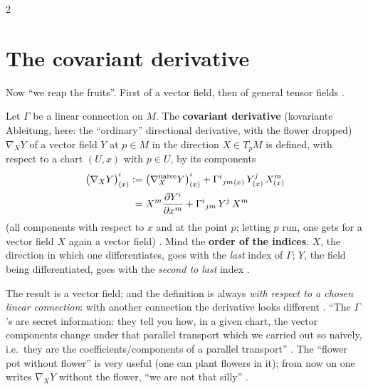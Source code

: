 \begin{paracol}{2}
\section{The covariant derivative}\label{sec:cf-covariant}

Now ``we reap the fruits''. First of a vector field, then of general tensor fields .

\begin{definition}\label{def:cf-covariant}
Let $\Gamma$ be a linear connection on $M$. The \textbf{covariant derivative} (kovariante Ableitung, here: the ``ordinary'' directional
derivative, with the flower dropped) $\nabla_XY$ of a vector field $Y$ at $p\in M$ in the direction $X\in T_pM$ is defined,
with respect to a chart $(U,x)$ with $p\in U$, by its components
\begin{align}\label{eq:cf-covariant}
  \bigl(\nabla_XY\bigr)^i_{(x)}&:=\bigl(\nabla^{\text{naive}}_XY\bigr)^i_{(x)}+\Gamma^i{}_{jm}{}_{(x)}\,Y^j_{(x)}\,X^m_{(x)}\notag\\
  &\;=X^m\frac{\partial Y^i}{\partial x^m}+\Gamma^i{}_{jm}\,Y^j\,X^m
\end{align}
(all components with respect to $x$ and at the point $p$; letting $p$ run, one gets for a vector field $X$ again a vector field)
. Mind the \textbf{order of the indices}: $X$, the direction in which one differentiates, goes with the
\emph{last} index of $\Gamma$; $Y$, the field being differentiated, goes with the \emph{second to last} index .
\end{definition}
The result is a vector field; and the definition is always \emph{with respect to a chosen linear connection}: with another
connection the derivative looks different . ``The $\Gamma$'s are secret information: they tell you how, in a given
chart, the vector components change under that parallel transport which we carried out so naively, i.e.\ they are the
coefficients/components of a parallel transport'' . The ``flower pot without flower'' is very useful (one can plant
flowers in it); from now on one writes $\nabla_XY$ without the flower, ``we are not that silly'' .


\end{paracol}

